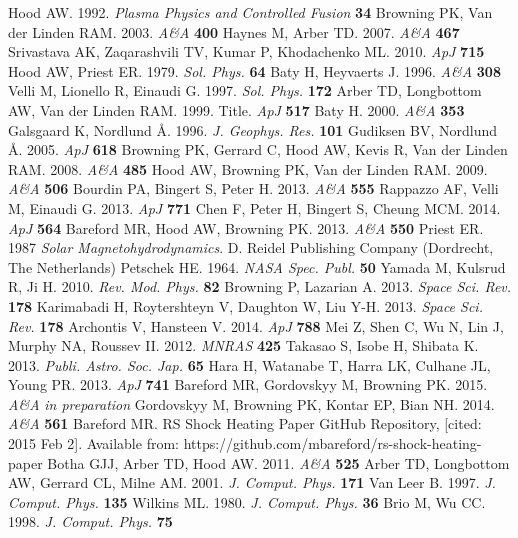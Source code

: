 \documentclass{./packages/rs/rsproca}
\begin{document}
\begin{thebibliography}{9}
 Hood AW. 1992. \textit{Plasma Physics and Controlled Fusion} \textbf{34}
 Browning PK, Van der Linden RAM. 2003. \textit{A\&A} \textbf{400}
 Haynes M, Arber TD. 2007. \textit{A\&A} \textbf{467}
 Srivastava AK, Zaqarashvili TV, Kumar P, Khodachenko ML. 2010. \textit{ApJ} \textbf{715}
 Hood AW, Priest ER. 1979. \textit{Sol. Phys.} \textbf{64}
 Baty H, Heyvaerts J. 1996. \textit{A\&A} \textbf{308}
 Velli M, Lionello R, Einaudi G. 1997. \textit{Sol. Phys.} \textbf{172}
 Arber TD, Longbottom AW, Van der Linden RAM. 1999. Title. \textit{ApJ} \textbf{517}
 Baty H. 2000. \textit{A\&A} \textbf{353}
 Galsgaard K, Nordlund \AA. 1996. \textit{J. Geophys. Res.} \textbf{101}
 Gudiksen BV, Nordlund \AA. 2005. \textit{ApJ} \textbf{618}
 Browning PK, Gerrard C, Hood AW, Kevis R, Van der Linden RAM. 2008. \textit{A\&A} \textbf{485}
 Hood AW, Browning PK, Van der Linden RAM. 2009. \textit{A\&A} \textbf{506}
 Bourdin PA, Bingert S, Peter H. 2013. \textit{A\&A} \textbf{555}
 Rappazzo AF, Velli M, Einaudi G. 2013. \textit{ApJ} \textbf{771}
 Chen F, Peter H, Bingert S, Cheung MCM. 2014. \textit{ApJ} \textbf{564}
 Bareford MR, Hood AW, Browning PK. 2013. \textit{A\&A} \textbf{550}
 Priest ER. 1987 \textit{Solar Magnetohydrodynamics}. D. Reidel Publishing Company (Dordrecht, The Netherlands)
 Petschek HE. 1964. \textit{NASA Spec. Publ.} \textbf{50}
 Yamada M, Kulsrud R, Ji H. 2010. \textit{Rev. Mod. Phys.} \textbf{82}
 Browning P, Lazarian A. 2013. \textit{Space Sci. Rev.} \textbf{178}
 Karimabadi H, Roytershteyn V, Daughton W, Liu Y-H. 2013. \textit{Space Sci. Rev.} \textbf{178}
 Archontis V, Hansteen V. 2014. \textit{ApJ} \textbf{788}
 Mei Z, Shen C, Wu N, Lin J, Murphy NA, Roussev II. 2012. \textit{MNRAS} \textbf{425}
 Takasao S, Isobe H, Shibata K. 2013. \textit{Publi. Astro. Soc. Jap.} \textbf{65}
 Hara H, Watanabe T, Harra LK, Culhane JL, Young PR. 2013. \textit{ApJ} \textbf{741}
 Bareford MR, Gordovskyy M, Browning PK. 2015. \textit{A\&A} \textit{in preparation}
 Gordovskyy M, Browning PK, Kontar EP, Bian NH. 2014. \textit{A\&A} \textbf{561}
 Bareford MR. RS Shock Heating Paper GitHub Repository, [cited: 2015 Feb 2]. Available from: https://github.com/mbareford/rs-shock-heating-paper
 Botha GJJ, Arber TD, Hood AW. 2011. \textit{A\&A} \textbf{525}
 Arber TD, Longbottom AW, Gerrard CL, Milne AM. 2001. \textit{J. Comput. Phys.} \textbf{171}
 Van Leer B. 1997. \textit{J. Comput. Phys.} \textbf{135}
 Wilkins ML. 1980. \textit{J. Comput. Phys.} \textbf{36}
 Brio M, Wu CC. 1998. \textit{J. Comput. Phys.} \textbf{75}


\end{thebibliography}
\end{document}
